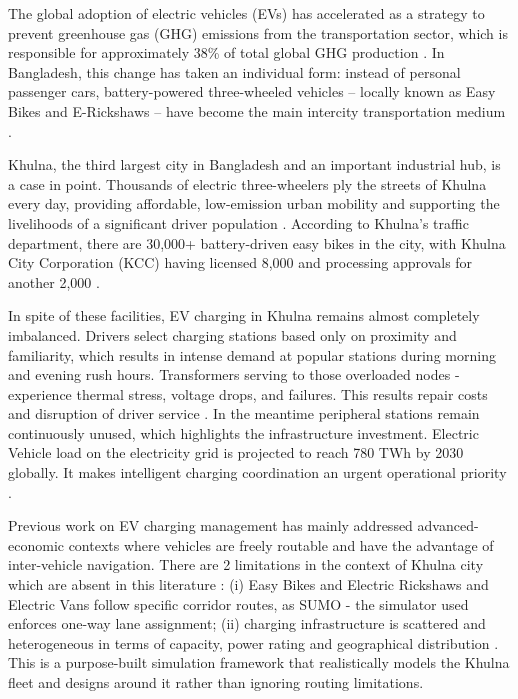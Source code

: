 \documentclass[conference]{IEEEtran}
\begin{document}
The global adoption of electric vehicles (EVs) has accelerated as a
strategy to prevent greenhouse gas (GHG) emissions from the
transportation sector, which is responsible for approximately 38\% of
total global GHG production \cite{b1}. In Bangladesh, this change has
taken an individual form: instead of personal passenger cars,
battery-powered three-wheeled vehicles -- locally known as Easy Bikes
and E-Rickshaws -- have become the main intercity transportation medium \cite{b9}.

Khulna, the third largest city in Bangladesh and an important industrial
hub, is a case in point. Thousands of electric three-wheelers ply the
streets of Khulna every day, providing affordable, low-emission urban
mobility and supporting the livelihoods of a significant driver
population \cite{b2}. According to Khulna's traffic department, there are 30,000+ battery-driven easy bikes in the city, with Khulna City Corporation (KCC) having licensed 8,000 and processing approvals for another 2,000 \cite{b2}.

In spite of these facilities, EV charging in Khulna remains almost
completely imbalanced. Drivers select charging stations based only on
proximity and familiarity, which results in intense demand at popular
stations during morning and evening rush hours. Transformers serving to
those overloaded nodes - experience thermal stress, voltage drops, and
failures. This results repair costs and disruption of driver service \cite{b14}. In
the meantime peripheral stations remain continuously unused, which
highlights the infrastructure investment. Electric Vehicle load on the
electricity grid is projected to reach 780 TWh by 2030 \cite{b3, b4}
globally. It makes intelligent charging coordination an urgent
operational priority \cite{b16}.

Previous work on EV charging management has mainly addressed
advanced-economic contexts where vehicles are freely routable \cite{b5, b6} and have
the advantage of inter-vehicle navigation. There are 2 limitations in
the context of Khulna city which are absent in this literature : (i)
Easy Bikes and Electric Rickshaws and Electric Vans follow specific
corridor routes, as SUMO - the simulator used enforces one-way lane
assignment; (ii) charging infrastructure is scattered and heterogeneous
in terms of capacity, power rating and geographical distribution \cite{b15}. This
is a purpose-built simulation framework that realistically models the
Khulna fleet and designs around it rather than ignoring routing
limitations.
\end{document}
